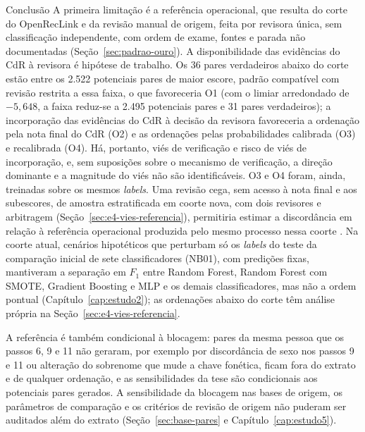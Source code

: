 \begin{chapter}{Conclusão}
A primeira limitação é a referência operacional, que resulta do corte do OpenRecLink e da revisão manual de origem, feita por revisora única, sem classificação independente, com ordem de exame, fontes e parada não documentadas (Seção~\ref{sec:padrao-ouro}). A disponibilidade das evidências do CdR à revisora é hipótese de trabalho. Os 36 pares verdadeiros abaixo do corte estão entre os 2.522 potenciais pares de maior escore, padrão compatível com revisão restrita a essa faixa, o que favoreceria O1 (com o limiar arredondado de $-5{,}648$, a faixa reduz-se a 2.495 potenciais pares e 31 pares verdadeiros); a incorporação das evidências do CdR à decisão da revisora favoreceria a ordenação pela nota final do CdR (O2) e as ordenações pelas probabilidades calibrada (O3) e recalibrada (O4). Há, portanto, viés de verificação e risco de viés de incorporação, e, sem suposições sobre o mecanismo de verificação, a direção dominante e a magnitude do viés não são identificáveis. O3 e O4 foram, ainda, treinadas sobre os mesmos \textit{labels}. Uma revisão cega, sem acesso à nota final e aos subescores, de amostra estratificada em coorte nova, com dois revisores e arbitragem (Seção~\ref{sec:e4-vies-referencia}), permitiria estimar a discordância em relação à referência operacional produzida pelo mesmo processo nessa coorte \cite{Harron2017linkagequality}. Na coorte atual, cenários hipotéticos que perturbam só os \textit{labels} do teste da comparação inicial de sete classificadores (NB01), com predições fixas, mantiveram a separação em $F_1$ entre Random Forest, Random Forest com SMOTE, Gradient Boosting e MLP e os demais classificadores, mas não a ordem pontual (Capítulo~\ref{cap:estudo2}); as ordenações abaixo do corte têm análise própria na Seção~\ref{sec:e4-vies-referencia}.

A referência é também condicional à blocagem: pares da mesma pessoa que os passos 6, 9 e 11 não geraram, por exemplo por discordância de sexo nos passos 9 e 11 ou alteração do sobrenome que mude a chave fonética, ficam fora do extrato e de qualquer ordenação, e as sensibilidades da tese são condicionais aos potenciais pares gerados. A sensibilidade da blocagem nas bases de origem, os parâmetros de comparação e os critérios de revisão de origem não puderam ser auditados além do extrato (Seção~\ref{sec:base-pares} e Capítulo~\ref{cap:estudo5}).


\end{chapter}
